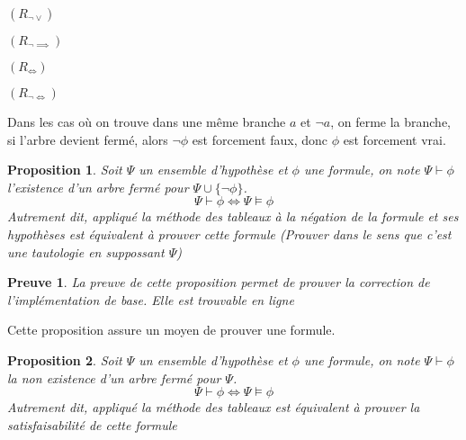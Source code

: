 \documentclass{paper}
\newtheorem{prop}{Proposition}
\newtheorem{preuve}{Preuve}
\begin{document}
$(R_{\lnot\lor})$
$(R_{\lnot\implies})$
$(R_{\Leftrightarrow})$
$(R_{\lnot\Leftrightarrow})$

Dans les cas où on trouve dans une même branche $a$ et $\lnot a$, on ferme la branche, si l'arbre devient fermé, alors $\lnot\phi$ est forcement faux, donc $\phi$ est forcement vrai.

\begin{prop}
    Soit $\Psi$ un ensemble d'hypothèse et $\phi$ une formule, on note $\Psi\vdash\phi$ l'existence d'un arbre fermé pour $\Psi\cup\{\lnot\phi\}$.
    $$\Psi\vdash\phi \Leftrightarrow \Psi\vDash\phi$$
    Autrement dit, appliqué la méthode des tableaux à la négation de la formule et ses hypothèses est équivalent à prouver cette formule (\textit{Prouver dans le sens que c'est une tautologie en suppossant $\Psi$})
\end{prop}

\begin{preuve}
    La preuve de cette proposition permet de prouver la correction de l'implémentation de base.
    Elle est trouvable en ligne
\end{preuve}
Cette proposition assure un moyen de prouver une formule.

\begin{prop}
    Soit $\Psi$ un ensemble d'hypothèse et $\phi$ une formule, on note $\Psi\vdash\phi$ la non existence d'un arbre fermé pour $\Psi$.
    $$\Psi\vdash\phi \Leftrightarrow \Psi\vDash\phi$$
    Autrement dit, appliqué la méthode des tableaux est équivalent à prouver la satisfaisabilité de cette formule
\end{prop}
\end{document}
